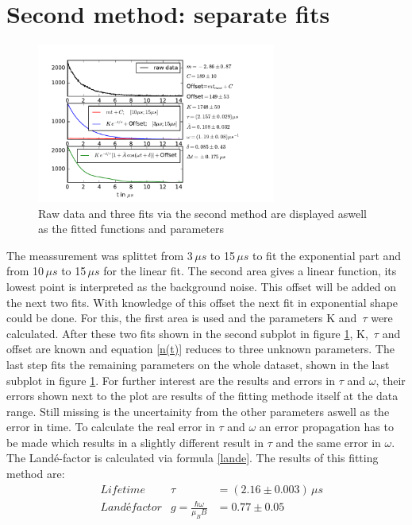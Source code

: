 \documentclass{include/thesisclass3}
\newcommand{\e}[1]{\,\si{#1}}
\begin{document}
\section{Second method: separate fits}
\label{second}
\begin{figure}[H]
	\begin{center}
		\includegraphics[width=0.7\textwidth]{images/plot2.pdf}
		\caption{Raw data and three fits via the second method are displayed aswell as the fitted functions and parameters}
		\label{method2}
	\end{center}
\end{figure}
The meassurement was splittet from 3$\e{\mu s}$ to 15$\e{\mu s}$ to fit the exponential part and from 10$\e{\mu s}$ to 15$\e{\mu s}$ for the linear fit.
The second area gives a linear function, its lowest point is interpreted as the background noise. This offset will be added on the next two fits. With knowledge of this offset the next fit in exponential shape could be done. For this, the first area is used and the parameters K and $\e{\tau}$ were calculated. After these two fits shown in the second subplot in figure \ref{method2}, K, $\e{\tau}$ and offset are known and equation \ref{n(t)} reduces to three unknown parameters. The last step fits the remaining parameters on the whole dataset, shown in the last subplot in figure \ref{method2}. For further interest are the results and errors in $\tau$ and $\omega$, their errors shown next to the plot are results of the fitting methode itself at the data range. Still missing is the uncertainity from the other parameters aswell as the error in time. To calculate the real error in $\tau$ and $\omega$ an error propagation has to be made which results in a slightly different result in $\tau$ and the same error in $\omega$. The Landé-factor is calculated via formula \ref{lande}. The results of this fitting method are:
\begin{align}
&\e{Lifetime} &\tau &=(2.16\pm 0.003)\e{\mu s}\\
&\e{Landé factor} &g = \frac{\hbar \omega}{\mu_B B}&=0.77 \pm 0.05
\end{align}
\end{document}
